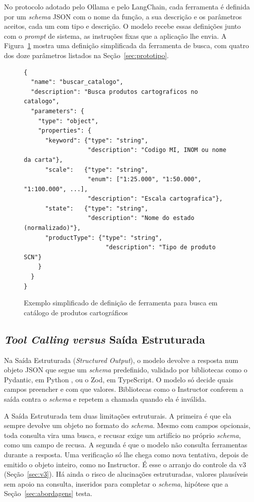 No protocolo adotado pelo Ollama e pelo LangChain, cada ferramenta é definida por um \textit{schema} JSON com o nome da função, a sua descrição e os parâmetros aceitos, cada um com tipo e descrição. O modelo recebe essas definições junto com o \textit{prompt} de sistema, as instruções fixas que a aplicação lhe envia. A Figura~\ref{fig:exemplo_tool_schema} mostra uma definição simplificada da ferramenta de busca, com quatro dos doze parâmetros listados na Seção~\ref{sec:prototipo}.

\begin{figure}[h]
\centering
\begin{verbatim}
{
  "name": "buscar_catalogo",
  "description": "Busca produtos cartograficos no catalogo",
  "parameters": {
    "type": "object",
    "properties": {
      "keyword": {"type": "string",
                  "description": "Codigo MI, INOM ou nome da carta"},
      "scale":   {"type": "string",
                  "enum": ["1:25.000", "1:50.000", "1:100.000", ...],
                  "description": "Escala cartografica"},
      "state":   {"type": "string",
                  "description": "Nome do estado (normalizado)"},
      "productType": {"type": "string",
                       "description": "Tipo de produto SCN"}
    }
  }
}
\end{verbatim}
\caption{Exemplo simplificado de definição de ferramenta para busca em catálogo de produtos cartográficos}
\label{fig:exemplo_tool_schema}
\end{figure}

\subsection{\textit{Tool Calling} \textit{versus} Saída Estruturada}
\label{sec:tc-vs-se}

Na Saída Estruturada (\textit{Structured Output}), o modelo devolve a resposta num objeto JSON que segue um \textit{schema} predefinido, validado por bibliotecas como o Pydantic, em Python \cite{pydantic2019}, ou o Zod, em TypeScript. O modelo só decide quais campos preencher e com que valores. Bibliotecas como o Instructor \cite{instructor2023} conferem a saída contra o \textit{schema} e repetem a chamada quando ela é inválida.

A Saída Estruturada tem duas limitações estruturais. A primeira é que ela sempre devolve um objeto no formato do \textit{schema}. Mesmo com campos opcionais, toda consulta vira uma busca, e recusar exige um artifício no próprio \textit{schema}, como um campo de recusa. A segunda é que o modelo não consulta ferramentas durante a resposta. Uma verificação só lhe chega como nova tentativa, depois de emitido o objeto inteiro, como no Instructor. É esse o arranjo do controle da v3 (Seção~\ref{sec:v3}). Há ainda o risco de alucinações estruturadas, valores plausíveis sem apoio na consulta, inseridos para completar o \textit{schema}, hipótese que a Seção~\ref{sec:abordagens} testa.

